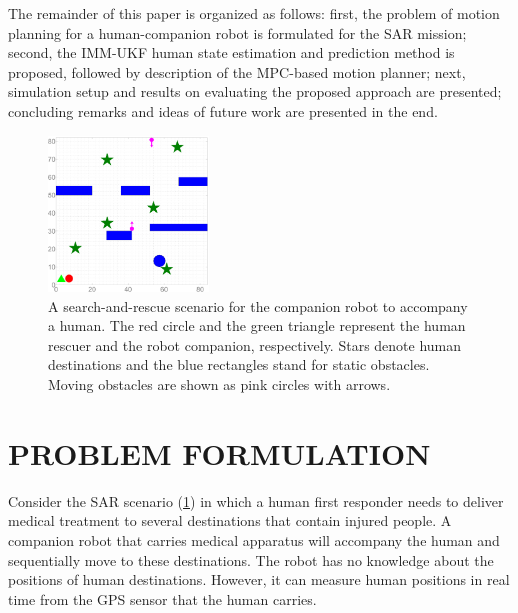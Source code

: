 \documentclass[letterpaper, 10 pt, conference]{ieeeconf}
\begin{document}
	The remainder of this paper is organized as follows:
	first, the problem of motion planning for a human-companion robot is formulated for the SAR mission;
	second, the IMM-UKF human state estimation and prediction method is proposed, followed by description of the MPC-based motion planner;
	next, simulation setup and results on evaluating the proposed approach are presented; 
	concluding remarks and ideas of future work are presented in the end.
	
	\begin{figure}
		\centering		
		\includegraphics[width=0.38\textwidth]{figures/sim_traj_init}		
		\caption{A search-and-rescue scenario for the companion robot to accompany a human. The red circle and the green triangle represent the human rescuer and the robot companion, respectively. Stars denote human destinations and the blue rectangles stand for static obstacles. Moving obstacles are shown as pink circles with arrows.}
		\label{fig:ref_traj_init}
	\end{figure}
	
	\section{PROBLEM FORMULATION}\label{sec:formulation}
	Consider the SAR scenario (\cref{fig:ref_traj_init}) in which a human first responder needs to deliver medical treatment to several destinations that contain injured people. 
	A companion robot that carries medical apparatus will accompany the human and sequentially move to these destinations.
	The robot has no knowledge about the positions of human destinations.
	However, it can measure human positions in real time from the GPS sensor that the human carries.
	
\end{document}
